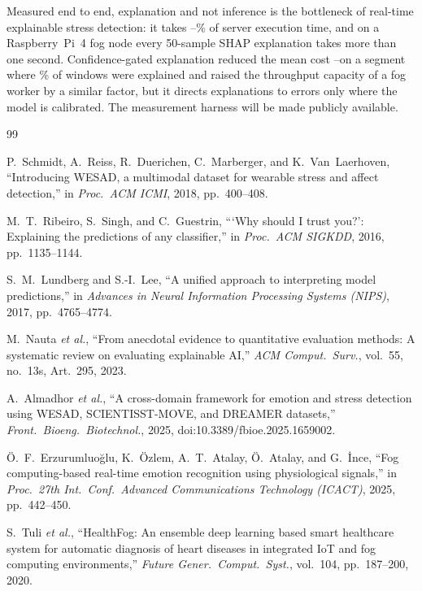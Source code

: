 \documentclass[conference]{IEEEtran}
\begin{document}
Measured end to end, explanation and not inference is the bottleneck of
real-time explainable stress detection: it takes
\XaiShareMin--\XaiShareMax\% of server execution time, and on a
Raspberry~Pi~4 fog node every 50-sample SHAP explanation takes more than
one second. Confidence-gated explanation reduced the mean cost
\SelExecGainMin--\SelExecGainMax\x on a segment where \SelShapCRate\% of
windows were explained and raised the throughput capacity of a fog worker
by a similar factor, but it directs explanations to errors only where the
model is calibrated. The measurement harness will be made publicly
available.

\begin{thebibliography}{99}
\footnotesize

P.~Schmidt, A.~Reiss, R.~Duerichen, C.~Marberger, and K.~Van~Laerhoven,
``Introducing WESAD, a multimodal dataset for wearable stress and affect
detection,'' in \emph{Proc.\ ACM ICMI}, 2018, pp.~400--408.

M.~T.~Ribeiro, S.~Singh, and C.~Guestrin, ```Why should I trust you?':
Explaining the predictions of any classifier,'' in \emph{Proc.\ ACM SIGKDD},
2016, pp.~1135--1144.

S.~M.~Lundberg and S.-I.~Lee, ``A unified approach to interpreting model
predictions,'' in \emph{Advances in Neural Information Processing Systems
(NIPS)}, 2017, pp.~4765--4774.

M.~Nauta \emph{et al.}, ``From anecdotal evidence to quantitative evaluation
methods: A systematic review on evaluating explainable AI,'' \emph{ACM
Comput.\ Surv.}, vol.~55, no.~13s, Art.~295, 2023.

A.~Almadhor \emph{et al.}, ``A cross-domain framework for emotion and
stress detection using WESAD, SCIENTISST-MOVE, and DREAMER datasets,''
\emph{Front.\ Bioeng.\ Biotechnol.}, 2025, doi:10.3389/fbioe.2025.1659002.

\"O.~F.~Erzurumluo\u{g}lu, K.~\"Ozlem, A.~T.~Atalay, \"O.~Atalay, and
G.~\.{I}nce, ``Fog computing-based real-time emotion recognition using
physiological signals,'' in \emph{Proc.\ 27th Int.\ Conf.\ Advanced
Communications Technology (ICACT)}, 2025, pp.~442--450.

S.~Tuli \emph{et al.}, ``HealthFog: An ensemble deep learning based smart
healthcare system for automatic diagnosis of heart diseases in integrated
IoT and fog computing environments,'' \emph{Future Gener.\ Comput.\ Syst.},
vol.~104, pp.~187--200, 2020.


\end{thebibliography}
\end{document}
